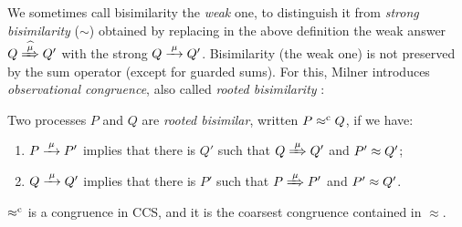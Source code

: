 We sometimes call bisimilarity the \emph{weak} one, to
distinguish it from \emph{strong bisimilarity} ($\sim$)
obtained by replacing in the above definition   the weak answer $
Q\Arcap\mu Q'$ with the strong  $Q \arr \mu Q'$.
Bisimilarity (the weak one) is not preserved by the sum operator (except for
guarded sums). For this, Milner introduces \emph{observational congruence}, also called \emph{rooted
  bisimilarity} \cite{Gorrieri:2015jt,Sangiorgi:2011ut}:
\begin{definition}%
\label{d:rootedBisimilarity}
Two processes $P$ and $Q$ are \emph{rooted bisimilar}, written $P
\mathrel{\approx^{\rm{c}}} Q$, if we have:
\begin{enumerate}
 \item  $P \arr\mu P'$ implies that there is $Q'$ such that $Q
   \Arr\mu Q'$ and $P' \approx Q'$;
 \item  $Q \arr\mu Q'$ implies that there is $P'$ such that $P
   \Arr\mu P'$ and $P' \approx Q'$. %
\end{enumerate}
\end{definition}

\begin{theorem}
\label{t:rapproxCongruence}
$\mathrel{\approx^{\rm{c}}}$ is a congruence in CCS, and it is the
coarsest congruence contained in $\approx$.
\end{theorem}


